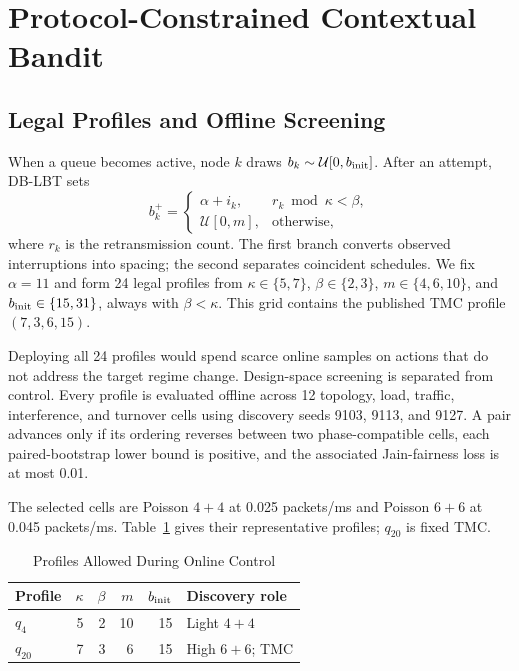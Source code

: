 \section{Protocol-Constrained Contextual Bandit}
\label{sec:method}

\subsection{Legal Profiles and Offline Screening}

When a queue becomes active, node $k$ draws
$b_k\sim\mathcal U[0,b_{\rm init}]$. After an attempt, DB-LBT sets
\begin{equation}
b_k^{+}=
\begin{cases}
\alpha+i_k, & r_k\bmod\kappa<\beta,\\
\mathcal U[0,m], & \text{otherwise},
\end{cases}
\label{eq:dblbt}
\end{equation}
where $r_k$ is the retransmission count. The first branch converts observed
interruptions into spacing; the second separates coincident schedules. We fix
$\alpha=11$ and form 24 legal profiles from
$\kappa\in\{5,7\}$, $\beta\in\{2,3\}$,
$m\in\{4,6,10\}$, and $b_{\rm init}\in\{15,31\}$, always with
$\beta<\kappa$. This grid contains the published TMC profile
$(7,3,6,15)$.

Deploying all 24 profiles would spend scarce online samples on actions that do
not address the target regime change. Design-space screening is separated
from control. Every profile is evaluated offline across 12
topology, load, traffic, interference, and turnover cells using discovery
seeds 9103, 9113, and 9127. A pair advances only if its ordering reverses
between two phase-compatible cells, each paired-bootstrap lower bound is
positive, and the associated Jain-fairness loss is at most 0.01.

The selected cells are Poisson $4+4$ at 0.025 packets/ms and Poisson $6+6$ at
0.045 packets/ms. Table~\ref{tab:profiles} gives their representative profiles;
$q_{20}$ is fixed TMC.

\begin{table}[!t]
\caption{Profiles Allowed During Online Control}
\label{tab:profiles}
\centering
\footnotesize
\begin{tabular}{@{}lrrrrl@{}}
\toprule
Profile & $\kappa$ & $\beta$ & $m$ & $b_{\rm init}$ & Discovery role \\
\midrule
$q_4$ & 5 & 2 & 10 & 15 & Light $4+4$ \\
$q_{20}$ & 7 & 3 & 6 & 15 & High $6+6$; TMC \\
\bottomrule
\end{tabular}
\end{table}

